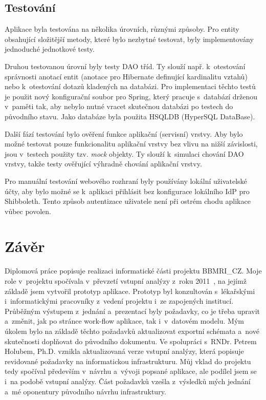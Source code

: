 \documentclass[11pt, final, oneside]{fithesis2}
\newcommand{\ProjectName}{\mbox{BBMRI\_CZ}\xspace}
\begin{document}
\section{Testování}
Aplikace byla testována na několika úrovních, různými způsoby. Pro entity obsahující složitější metody, které bylo nezbytné testovat, byly implementovány jednoduché jednotkové testy. 

Druhou testovanou úrovní byly testy DAO tříd. Ty slouží např. k~otestování správnosti anotací entit (anotace pro Hibernate definující kardinalitu vztahů) nebo k~otestování dotazů kladených na databázi. Pro implementaci těchto testů je použit nový konfigurační soubor pro Spring, který pracuje s~databází drženou v~paměti tak, aby nebylo nutné vracet skutečnou databázi po testech do původního stavu. Jako databáze byla použita HSQLDB (HyperSQL DataBase).

Další fází testování bylo ověření funkce aplikační (servisní) vrstvy. Aby bylo možné testovat pouze funkcionalitu aplikační vrstvy bez vlivu na nižší závislosti, jsou v~testech použity tzv. \textit{mock} objekty. Ty slouží k~simulaci chování DAO vrstvy, takže testy ověřující výhradně chování aplikační vrstvy.

Pro manuální testování webového rozhraní byly používány lokální uživatelské účty, aby bylo možné se k~aplikaci přihlásit bez konfigurace lokálního IdP pro Shibboleth. Tento způsob autentizace uživatele není při ostrém chodu aplikace vůbec povolen.


\chapter{Závěr}
Diplomová práce popisuje realizaci informatické části projektu \ProjectName. Moje role v~projektu spočívala v~převzetí vstupní analýzy z~roku 2011~\cite{ARCH_2011_12_29}, na jejímž základě jsem vytvořil prototyp aplikace. Prototyp byl konzultován s~lékařskými i~informatickými pracovníky z~vedení projektu i~ze zapojených institucí. Průběžným výstupem z~jednání a~prezentací byly požadavky, co je třeba upravit a~změnit, jak po stránce work-flow aplikace, tak i~v~datovém modelu. Mým úkolem bylo na základě těchto požadavků aktualizovat exportní schémata a~nové skutečnosti doplňovat do původního dokumentu. Ve spolupráci s~RNDr. Petrem Holubem, Ph.D. vznikla aktualizovaná verze vstupní analýzy, která popisuje revidované požadavky na informatickou infrastrukturu. Můj vklad do projektu tedy spočíval především v~návrhu a~vývoji popsané aplikace, ale podílel jsem se i~na podobě vstupní analýzy. Část požadavků vzešla z~výsledků mých jednání a~mé oponentury původního návrhu infrastruktury.
\end{document}
